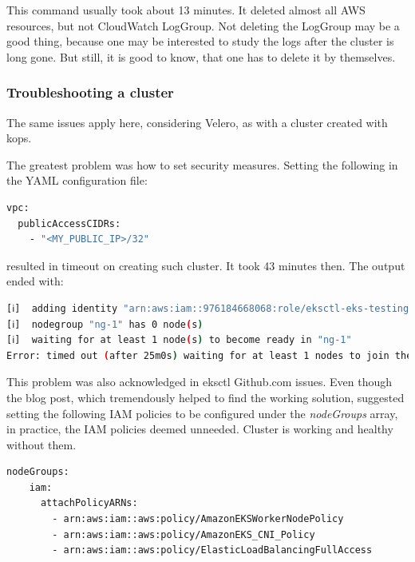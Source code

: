 This command usually took about 13 minutes. It deleted almost all AWS resources, but not CloudWatch LogGroup. Not deleting the LogGroup may be a good thing, because one may be interested to study the logs after the cluster is long gone. But still, it is good to know, that one has to delete it by themselves.

\subsubsection{Troubleshooting a cluster}
\label{eks-troubleshooting}

The same issues apply here, considering Velero, as with a cluster created with kops.


The greatest problem was how to set security measures. Setting the following in the YAML configuration file:
\begin{lstlisting}[basicstyle=\tiny,caption={TODO},captionpos=b,language=Bash,xleftmargin=1cm]
vpc:
  publicAccessCIDRs:
    - "<MY_PUBLIC_IP>/32"
\end{lstlisting}
resulted in timeout on creating such cluster. It took 43 minutes then. The output ended with:

\begin{lstlisting}[basicstyle=\tiny,caption={TODO},captionpos=b,language=Bash,xleftmargin=1cm]
[ℹ]  adding identity "arn:aws:iam::976184668068:role/eksctl-eks-testing-nodegroup-ng-1-NodeInstanceRole-8VB5IDO1Z4KQ" to auth ConfigMap
[ℹ]  nodegroup "ng-1" has 0 node(s)
[ℹ]  waiting for at least 1 node(s) to become ready in "ng-1"
Error: timed out (after 25m0s) waiting for at least 1 nodes to join the cluster and become ready in "ng-1"
\end{lstlisting}
This problem was also acknowledged in eksctl Github.com issues\cite{eksctl-net-issue1}\cite{eksctl-net-issue2}. Even though the blog post\cite{eksctl-net-issue-solution}, which tremendously helped to find the working solution, suggested setting the following IAM policies to be configured under the \textit{nodeGroups} array, in practice, the IAM policies deemed unneeded. Cluster is working and healthy without them.
\begin{lstlisting}[basicstyle=\tiny,caption={TODO},captionpos=b,language=Bash,xleftmargin=1cm]
nodeGroups:
    iam:
      attachPolicyARNs:
        - arn:aws:iam::aws:policy/AmazonEKSWorkerNodePolicy
        - arn:aws:iam::aws:policy/AmazonEKS_CNI_Policy
        - arn:aws:iam::aws:policy/ElasticLoadBalancingFullAccess
\end{lstlisting}

